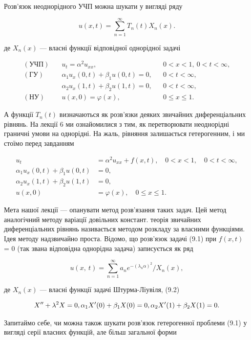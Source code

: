 \documentclass[
  ukrainian,
]{article}
\begin{document}
Розв'язок неоднорідного УЧП можна шукати у вигляді ряду

\[
u(x,t) = \sum_{n=1}^{\infty} T_n(t) X_n(x).
\]

де \(X_n(x)\) --- власні функції відповідної однорідної задачі

\[
\begin{aligned}
(\text{УЧП})\quad & u_t = \alpha^2 u_{xx}, && 0 < x < 1,\ 0 < t < \infty, \\
(\text{ГУ})\quad & \alpha_1 u_x(0,t) + \beta_1 u(0,t) = 0, && 0 < t < \infty, \\
& \alpha_2 u_x(1,t) + \beta_2 u(1,t) = 0, && 0 < t < \infty, \\
(\text{НУ})\quad & u(x,0) = \varphi(x), && 0 \leqslant x \leqslant 1.
\end{aligned}
\]

А функції \(T_n(t)\) визначаються як розв'язки деяких звичайних
диференціальних рівнянь. На лекції 6 ми ознайомилися з тим, як
перетворювати неоднорідні граничні умови на однорідні. На жаль, рівняння
залишається гетерогенним, і ми стоїмо перед завданням

\[
\begin{aligned}
u_{t} &= \alpha^{2} u_{xx} + f(x, t), \quad 0 < x < 1, \quad 0 < t < \infty,\\
\alpha_{1} u_{x}(0, t) + \beta_{1} u(0, t) &= 0, \\
\alpha_{2} u_{x}(1, t) + \beta_{2} u(1, t) &= 0, \\
u(x, 0) &= \varphi(x), \quad 0 \le x \le 1.
\end{aligned}
\]

Мета нашої лекції --- опанувати метод розв'язання таких задач. Цей метод
аналогічний методу варіації довільних констант. теорія звичайних
диференціальних рівнянь називається методом розкладу за власними
функціями. Ідея методу надзвичайно проста. Відомо, що розв'язок задачі
(9.1) при \(f(x, t)\) = 0 (так звана відповідна однорідна задача)
записується як ряд

\[
u\left(x,\ t\right)=\sum_{n=1}^{\infty}a_{n}e^{-\left(\lambda_{n}\alpha\right)^{2}}/X_{n}\left(x\right),
\]

де \(X_n(x)\) --- власні функції задачі Штурма-Ліувіля, (9.2)

\[
X'' + \lambda^2 X = 0, \\ \alpha_1 X'(0) + \beta_1 X(0) = 0, \\ \alpha_2 X'(1) + \beta_2 X(1) = 0.
\]

Запитаймо себе, чи можна також шукати розв'язок гетерогенної проблеми
(9.1) у вигляді серії власних функцій, але більш загальної форми
\end{document}
